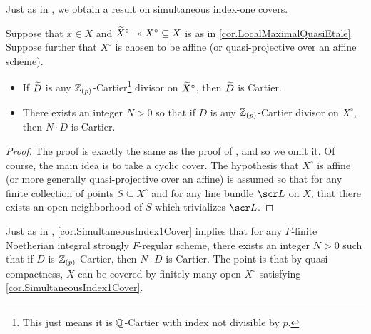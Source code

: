 \documentclass[12pt]{amsart}
\numberwithin{equation}{theorem}
\renewcommand{\:}{\colon}
\theoremstyle{theorem}
\def\todo#1{\textcolor{Mahogany}%
{\footnotesize\newline{\color{Mahogany}\fbox{\parbox{\textwidth-15pt}{\textbf{todo:
} #1}}}\newline}}
\begin{document}
Just as in \cite[Theorem 1.10]{GrebKebekusPeternellEtaleFundamental}, we obtain a result on simultaneous index-one covers.

\begin{corollary} \label{cor.SimultaneousIndex1Cover}
Suppose that $x \in X$ and $\widetilde X^\circ \twoheadrightarrow X^\circ \subseteq X$ is as in \autoref{cor.LocalMaximalQuasiEtale}.
Suppose further that $X^\circ$ is chosen to be affine (or quasi-projective over an affine scheme).
\begin{itemize}
\item[(a)]  If $\widetilde D$ is any $\mathbb{Z}_{(p)}$-Cartier\footnote{This just means it is $\mathbb{Q}$-Cartier with index not divisible by $p$.} divisor on $\widetilde X^\circ$, then $\widetilde D$ is Cartier.
\item[(b)]  There exists an integer $N > 0$ so that if $D$ is any $\mathbb{Z}_{(p)}$-Cartier divisor on $X^\circ$, then $N \cdot D$ is Cartier.
\end{itemize}
\end{corollary}

\begin{proof}
The proof is exactly the same as the proof of \cite[Theorem 1.10]{GrebKebekusPeternellEtaleFundamental}, and so we omit it.
Of course, the main idea is to take a cyclic cover.
The hypothesis that $X^\circ$ is affine (or more generally quasi-projective over an affine) is assumed so that for any finite collection of points $S \subseteq X^\circ$ and for any line bundle $\sL$ on $X$, that there exists an open neighborhood of $S$ which trivializes $\sL$.
\end{proof}

Just as in \cite{GrebKebekusPeternellEtaleFundamental}, \autoref{cor.SimultaneousIndex1Cover} implies that for any $F$-finite Noetherian integral strongly $F$-regular scheme, there exists an integer $N > 0$ such that if $D$ is $\mathbb{Z}_{(p)}$-Cartier, then $N \cdot D$ is Cartier.
The point is that by quasi-compactness, $X$ can be covered by finitely many open $X^\circ$ satisfying \autoref{cor.SimultaneousIndex1Cover}.




\end{document}

